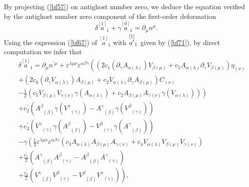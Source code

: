 \documentclass[a4paper,11pt]{article}
\begin{document}
By projecting (\ref{bf57}) on antighost number zero, we deduce the equation
verified by the antighost number zero component of the first-order
deformation
\begin{equation}
\delta \stackrel{[1]}{a}_{1}+\gamma \stackrel{[0]}{a}_{1}=\partial _{\mu
}n^{\mu }.  \label{bf72}
\end{equation}
Using the expression (\ref{bf67}) of $\stackrel{[1]}{a}_{1}$ with $\stackrel{%
[1]}{a^{\prime }}_{1}$ given by (\ref{bf71}), by direct computation we infer
that
\begin{eqnarray}
&&\delta \stackrel{[1]}{a}_{1}=\partial _{\mu }n^{\prime \mu }+\varepsilon
^{\lambda \mu \nu }\varepsilon ^{\alpha \beta \gamma }\left( \left(
2c_{1}\left( \partial _{\gamma }A_{\alpha (\lambda )}\right) V_{\beta (\mu
)}+c_{5}A_{\alpha (\lambda )}\partial _{\gamma }V_{\beta (\mu )}\right) \eta
_{(\nu )}\right.  \nonumber \\
&&+\left( 2c_{6}\left( \partial _{\gamma }V_{\alpha (\lambda )}\right)
A_{\beta (\mu )}+c_{2}V_{\alpha (\lambda )}\partial _{\gamma }A_{\beta (\mu
)}\right) C_{(\nu )}  \nonumber \\
&&\left. -\frac{1}{2}\left( c_{5}V_{\beta (\mu )}V_{\gamma (\nu )}\gamma
\left( A_{\alpha (\lambda )}\right) +c_{2}A_{\beta (\mu )}A_{\gamma (\nu
)}\gamma \left( V_{\alpha (\lambda )}\right) \right) \right)  \nonumber \\
&&+c_{2}^{\prime }\left( A_{\;\;(\beta )}^{\beta }\gamma \left(
V_{\;\;(\gamma )}^{\gamma }\right) -A_{\;\;(\beta )}^{\gamma }\gamma \left(
V_{\;\;(\gamma )}^{\beta }\right) \right)  \nonumber \\
&&+c_{3}^{\prime }\left( V_{\;\;(\gamma )}^{\gamma }\gamma \left(
A_{\;\;(\beta )}^{\beta }\right) -V_{\;\;(\gamma )}^{\beta }\gamma \left(
A_{\;\;(\beta )}^{\gamma }\right) \right)  \nonumber \\
&&-\gamma \left( \frac{1}{3}\varepsilon ^{\lambda \mu \nu }\varepsilon
^{\alpha \beta \gamma }\left( c_{3}A_{\alpha (\lambda )}A_{\beta (\mu
)}A_{\gamma (\nu )}+c_{4}V_{\alpha (\lambda )}V_{\beta (\mu )}V_{\gamma (\nu
)}\right) \right.  \nonumber \\
&&+\frac{c_{1}^{\prime }}{2}\left( A_{\;\;(\beta )}^{\gamma }A_{\;\;(\gamma
)}^{\beta }-A_{\;\;(\beta )}^{\beta }A_{\;\;(\gamma )}^{\gamma }\right)
\nonumber \\
&&\left. +\frac{c_{4}^{\prime }}{2}\left( V_{\;\;(\beta )}^{\gamma
}V_{\;\;(\gamma )}^{\beta }-V_{\;\;(\beta )}^{\beta }V_{\;\;(\gamma
)}^{\gamma }\right) \right) ,  \label{bf73}
\end{eqnarray}
\end{document}
